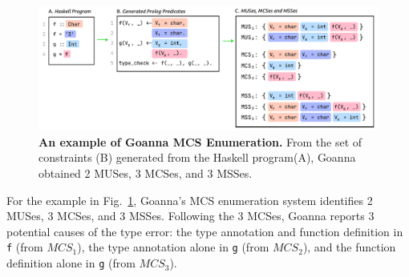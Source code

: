  
     \begin{figure}[ht!]
        \centering
        \includegraphics[width=\linewidth]{images/Enumeration-Example}
        \caption[An example of Goanna MCS Enumeration]{\textbf{An example of Goanna MCS Enumeration.} From the set of constraints (B) generated from the Haskell program(A), Goanna obtained 2 MUSes, 3 MCSes, and 3 MSSes. }
        \label{fig:enumeration-example}
    \end{figure}
    
   For the example in Fig.~\ref{fig:enumeration-example}, Goanna's MCS enumeration system identifies 2 MUSes, 3 MCSes, and 3 MSSes. Following the 3 MCSes, Goanna reports 3 potential causes of the type error: the type annotation and function definition in \texttt{f} (from $MCS_1$), the type annotation alone in \texttt{g} (from $MCS_2$), and the function definition alone in \texttt{g} (from $MCS_3$). 
   
%
%


